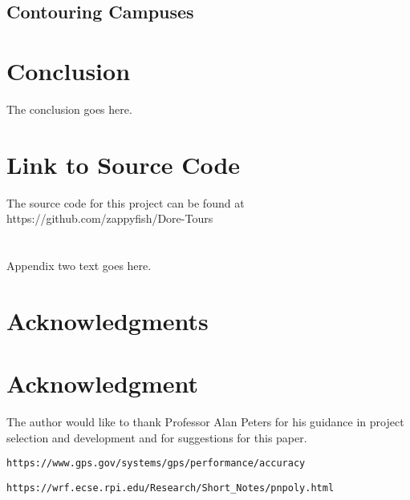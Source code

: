 \documentclass[12pt,journal,compsoc]{IEEEtran}
\begin{document}
\subsection{Contouring Campuses}



\section{Conclusion}
The conclusion goes here.


\appendices
\section{Link to Source Code}
The source code for this project can be found at https://github.com/zappyfish/Dore-Tours

\section{}
Appendix two text goes here.


\ifCLASSOPTIONcompsoc
  \section*{Acknowledgments}
\else
  \section*{Acknowledgment}
\fi


The author would like to thank Professor Alan Peters for his guidance in project selection and development and for suggestions for this paper.

\ifCLASSOPTIONcaptionsoff
  \newpage
\fi

\begin{thebibliography}{9}

\texttt{https://www.gps.gov/systems/gps/performance/accuracy}

\texttt{https://wrf.ecse.rpi.edu/Research/Short\_Notes/pnpoly.html}

\end{thebibliography}
\end{document}
